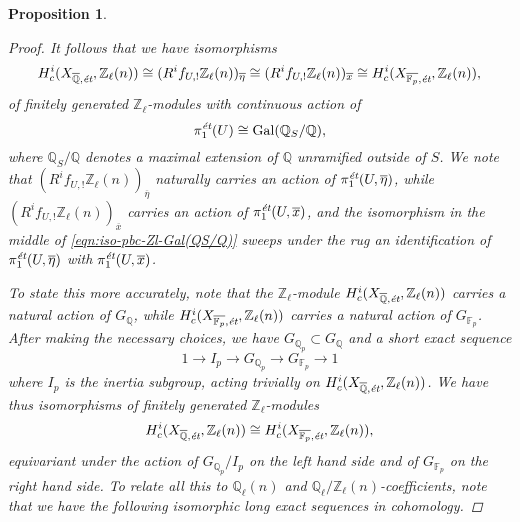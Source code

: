 \documentclass{article}
\DeclareMathOperator{\Gal}{Gal}
\newcommand{\FF}{\mathbb{F}}
\newcommand{\QQ}{\mathbb{Q}}
\newcommand{\ZZ}{\mathbb{Z}}
\newtheorem{proposition}[theorem]{Proposition}
\theoremstyle{definition}
\numberwithin{equation}{section}
\begin{document}
\begin{proposition}
\begin{proof}
    It follows that we have isomorphisms
    \begin{equation}
      \label{eqn:iso-pbc-Zl-Gal(QS/Q)}
      H^i_c (X_{\overline{\QQ}, \text{\it ét}}, \ZZ_\ell (n)) \cong (R^i f_{U,!} \ZZ_\ell (n))_{\overline{\eta}} \cong (R^i f_{U,!} \ZZ_\ell (n))_{\overline{x}} \cong H^i_c (X_{\overline{\FF_p}, \text{\it ét}}, \ZZ_\ell (n)),
    \end{equation}
    of finitely generated $\ZZ_\ell$-modules with continuous action of
    $$\pi_1^\text{\it ét} (U) \cong \Gal (\QQ_S/\QQ),$$
    where $\QQ_S/\QQ$ denotes a maximal extension of $\QQ$ unramified outside of
    $S$. We note that $(R^i f_{U,!} \ZZ_\ell (n))_{\overline{\eta}}$ naturally
    carries an action of $\pi_1^\text{\it ét} (U, \overline{\eta})$, while
    $(R^i f_{U,!} \ZZ_\ell (n))_{\overline{x}}$ carries an action of
    $\pi_1^\text{\it ét} (U, \overline{x})$, and the isomorphism in the middle
    of \eqref{eqn:iso-pbc-Zl-Gal(QS/Q)} sweeps under the rug an identification
    of $\pi_1^\text{\it ét} (U, \overline{\eta})$ with
    $\pi_1^\text{\it ét} (U, \overline{x})$.

    To state this more accurately, note that the $\ZZ_\ell$-module
    $H^i_c (X_{\overline{\QQ}, \text{\it ét}}, \ZZ_\ell (n))$ carries a natural
    action of $G_\QQ$, while
    $H^i_c (X_{\overline{\FF_p}, \text{\it ét}}, \ZZ_\ell (n))$ carries a
    natural action of $G_{\FF_p}$. After making the necessary choices, we have
    $G_{\QQ_p} \subset G_\QQ$ and a short exact sequence
    $$1 \to I_p \to G_{\QQ_p} \to G_{\FF_p} \to 1$$
    where $I_p$ is the inertia subgroup, acting trivially on
    $H^i_c (X_{\overline{\QQ}, \text{\it ét}}, \ZZ_\ell (n))$. We have thus
    isomorphisms of finitely generated $\ZZ_\ell$-modules
    \[ H^i_c (X_{\overline{\QQ}, \text{\it ét}}, \ZZ_\ell (n)) \cong
    H^i_c (X_{\overline{\FF_p}, \text{\it ét}}, \ZZ_\ell (n)), \]
    equivariant under the action of $G_{\QQ_p}/I_p$ on the left hand side and of
    $G_{\FF_p}$ on the right hand side. To relate all this to $\QQ_\ell (n)$ and
    $\QQ_\ell/\ZZ_\ell (n)$-coefficients, note that we have the following
    isomorphic long exact sequences in cohomology.


\end{proof}
\end{proposition}
\end{document}
